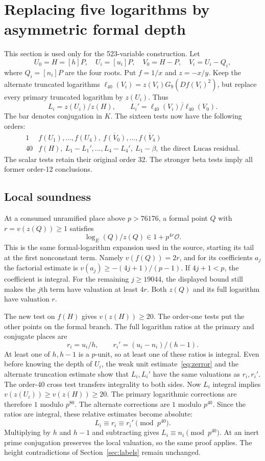 \documentclass[11pt]{article}
\begin{document}
\section{Replacing five logarithms by asymmetric formal depth}\label{sec:depth}
This section is used only for the 523-variable construction. Let
\[
 U_0=H=[h]P,\quad U_i=[u_i]P,\quad
 V_0=H-P,\quad V_i=U_i-Q_i,
\]
where $Q_i=[n_i]P$ are the four roots. Put $f=1/x$ and $z=-x/y$. Keep the alternate truncated logarithms $\ell_{40}(V_i)=z(V_i)G_9(Df(V_i)^2)$, but replace every primary truncated logarithm by $z(U_i)$. Thus
\[
 L_i=z(U_i)/z(H),\qquad
 L_i'=\overline{\ell_{40}(V_i)/\ell_{40}(V_0)}.
\]
The bar denotes conjugation in $K$. The sixteen tests now have the following orders:
\[
\begin{array}{c|l}
1 & f(U_1),\ldots,f(U_4),\ \overline{f(V_0)},\ldots,\overline{f(V_4)}\\[2pt]
40 & f(H),\ L_1-L_1',\ldots,L_4-L_4',\ L_1-\beta,\
       \text{the direct Lucas residual}.
\end{array}
\]
The scalar tests retain their original order 32. The stronger beta tests imply all former order-12 conclusions.

\subsection{Local soundness}
At a consumed unramified place above $p>76176$, a formal point $Q$ with $r=v(z(Q))\ge1$ satisfies
\begin{equation}\label{eq:zerror}
 \log_E(Q)/z(Q)\in1+p^{4r}\mathcal O.
\end{equation}
This is the same formal-logarithm expansion used in the source, starting its tail at the first nonconstant term. Namely $v(f(Q))=2r$, and for its coefficients $a_j$ the factorial estimate is $v(a_j)\ge-(4j+1)/(p-1)$. If $4j+1<p$, the coefficient is integral. For the remaining $j\ge19044$, the displayed bound still makes the $j$th term have valuation at least $4r$. Both $z(Q)$ and its full logarithm have valuation $r$.

The new test on $f(H)$ gives $v(z(H))\ge20$. The order-one tests put the other points on the formal branch. The full logarithm ratios at the primary and conjugate places are
\[
 r_i=u_i/h,\qquad r_i'=(u_i-n_i)/(h-1).
\]
At least one of $h,h-1$ is a $p$-unit, so at least one of these ratios is integral. Even before knowing the depth of $U_i$, the weak unit estimate~\eqref{eq:zerror} and the alternate truncation estimate show that $L_i,L_i'$ have the same valuations as $r_i,r_i'$. The order-40 cross test transfers integrality to both sides. Now $L_i$ integral implies $v(z(U_i))\ge v(z(H))\ge20$. The primary logarithmic corrections are therefore $1$ modulo $p^{80}$. The alternate corrections are $1$ modulo $p^{40}$. Since the ratios are integral, these relative estimates become absolute:
\[
 L_i\equiv r_i\equiv r_i'\pmod {p^{40}}.
\]
Multiplying by $h$ and $h-1$ and subtracting gives $L_i\equiv n_i\pmod {p^{40}}$. At an inert prime conjugation preserves the local valuation, so the same proof applies. The height contradictions of Section~\ref{sec:labels} remain unchanged.
\end{document}
